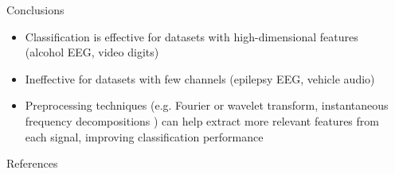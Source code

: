 \documentclass[final]{beamer}
\newlength{\sepwid}
\newlength{\onecolwid}
\begin{document}
\begin{frame}[t]
\begin{columns}[t]
\begin{column}{\sepwid}\end{column} %

\begin{column}{\onecolwid} %


\begin{block}{Conclusions}
    \begin{itemize}
        \item Classification is effective for datasets with high-dimensional features (alcohol EEG,
            video digits)

        \item Ineffective for datasets with few channels (epilepsy EEG, vehicle audio)

        \item Preprocessing techniques (e.g. Fourier or wavelet transform, instantaneous frequency
            decompositions \cite{chui_signal_2016}) can help extract more relevant features from
            each signal, improving classification performance
    \end{itemize}
\end{block}


\begin{block}{References}

\footnotesize{
\vspace{0.75in}}

\end{block}


\end{column}    %



\end{columns}
\end{frame}
\end{document}
